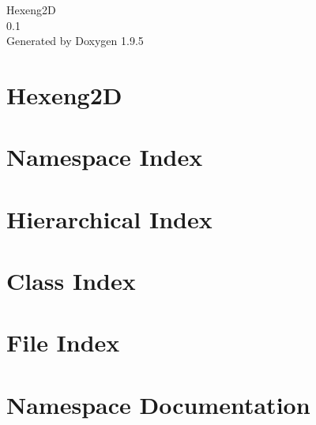 \documentclass[twoside]{book}
\newcommand{\+}{\discretionary{\mbox{\scriptsize$\hookleftarrow$}}{}{}}
\newcommand{\clearemptydoublepage}{%
    \newpage{\pagestyle{empty}\cleardoublepage}%
  }
\begin{document}
  \raggedbottom
    \hypersetup{pageanchor=false,
                bookmarksnumbered=true,
                pdfencoding=unicode
               }
  \begin{titlepage}
  \vspace*{7cm}
  \begin{center}%
  {\Large Hexeng2D}\\
  [1ex]\large 0.\+1 \\
  \vspace*{1cm}
  {\large Generated by Doxygen 1.9.5}\\
  \end{center}
  \end{titlepage}
  \clearemptydoublepage
  \tableofcontents
  \clearemptydoublepage
  \hypersetup{pageanchor=true}
\chapter{Hexeng2D}
\label{md__c__dev_repos__hexeng2_d__r_e_a_d_m_e}

\chapter{Namespace Index}

\chapter{Hierarchical Index}

\chapter{Class Index}

\chapter{File Index}

\chapter{Namespace Documentation}






\end{document}
